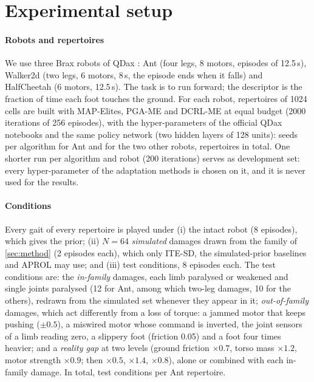 \section{Experimental setup}\label{sec:setup}

\paragraph{Robots and repertoires} We use three Brax robots of QDax \cite{chalumeau2023qdax,freeman2021brax}: Ant
(four legs, 8 motors, episodes of 12.5\,s), Walker2d (two legs, 6 motors, 8\,s, the episode ends when it falls) and
HalfCheetah (6 motors, 12.5\,s). The task is to run forward; the descriptor is the fraction of time each foot touches
the ground. For each robot, repertoires of 1024 cells are built with MAP-Elites, PGA-ME and DCRL-ME at equal budget
(2000 iterations of 256 episodes), with the hyper-parameters of the official QDax notebooks and the same policy network
(two hidden layers of 128 units): \NSeedsAnt{} seeds per algorithm for Ant and \NSeedsOther{} for the two other robots,
\NRepertoires{} repertoires in total. One shorter run per algorithm and robot (200 iterations) serves as development
set: every hyper-parameter of the adaptation methods is chosen on it, and it is never used for the results.

\paragraph{Conditions} Every gait of every repertoire is played under (i) the intact robot (8 episodes), which gives
the prior; (ii) $N=64$ \emph{simulated} damages drawn from the family of \cref{sec:method} (2 episodes each), which
only ITE-SD, the simulated-prior baselines and APROL may use; and (iii) test conditions, 8 episodes each. The test
conditions are: the \emph{in-family} damages, each limb paralysed or weakened and single joints paralysed (12 for
Ant, among which two-leg damages, 10 for the others), redrawn from the simulated set whenever they appear in it;
\emph{out-of-family} damages, which act differently from a loss of torque: a jammed motor that keeps pushing
($\pm0.5$), a miswired motor whose command is inverted, the joint sensors of a limb reading zero, a slippery foot
(friction 0.05) and a foot four times heavier; and a \emph{reality gap} at two levels (ground friction $\times0.7$,
torso mass $\times1.2$, motor strength $\times0.9$; then $\times0.5$, $\times1.4$, $\times0.8$), alone or combined with
each in-family damage. In total, \NTestConditions{} test conditions per Ant repertoire.

